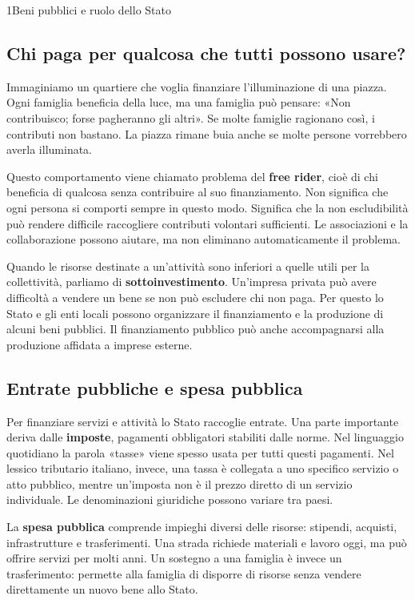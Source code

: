 \begin{lettura}{1}{Beni pubblici e ruolo dello Stato}
\subsection*{Chi paga per qualcosa che tutti possono usare?}
Immaginiamo un quartiere che voglia finanziare l'illuminazione di una piazza. Ogni famiglia beneficia della luce, ma una famiglia può pensare: «Non contribuisco; forse pagheranno gli altri». Se molte famiglie ragionano così, i contributi non bastano. La piazza rimane buia anche se molte persone vorrebbero averla illuminata.

Questo comportamento viene chiamato problema del \textbf{free rider}, cioè di chi beneficia di qualcosa senza contribuire al suo finanziamento. Non significa che ogni persona si comporti sempre in questo modo. Significa che la non escludibilità può rendere difficile raccogliere contributi volontari sufficienti. Le associazioni e la collaborazione possono aiutare, ma non eliminano automaticamente il problema.

Quando le risorse destinate a un'attività sono inferiori a quelle utili per la collettività, parliamo di \textbf{sottoinvestimento}. Un'impresa privata può avere difficoltà a vendere un bene se non può escludere chi non paga. Per questo lo Stato e gli enti locali possono organizzare il finanziamento e la produzione di alcuni beni pubblici. Il finanziamento pubblico può anche accompagnarsi alla produzione affidata a imprese esterne.

\subsection*{Entrate pubbliche e spesa pubblica}
Per finanziare servizi e attività lo Stato raccoglie entrate. Una parte importante deriva dalle \textbf{imposte}, pagamenti obbligatori stabiliti dalle norme. Nel linguaggio quotidiano la parola «tasse» viene spesso usata per tutti questi pagamenti. Nel lessico tributario italiano, invece, una tassa è collegata a uno specifico servizio o atto pubblico, mentre un'imposta non è il prezzo diretto di un servizio individuale. Le denominazioni giuridiche possono variare tra paesi.

La \textbf{spesa pubblica} comprende impieghi diversi delle risorse: stipendi, acquisti, infrastrutture e trasferimenti. Una strada richiede materiali e lavoro oggi, ma può offrire servizi per molti anni. Un sostegno a una famiglia è invece un trasferimento: permette alla famiglia di disporre di risorse senza vendere direttamente un nuovo bene allo Stato.


\end{lettura}
